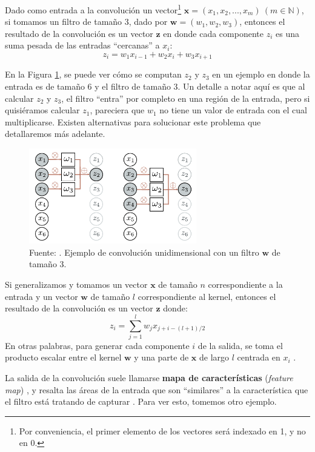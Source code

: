 \documentclass[../../main.tex]{subfiles}
\begin{document}
Dado como entrada a la convolución un vector\footnote{Por conveniencia, el primer elemento
de los vectores será indexado en 1, y no en 0.} \(\bm{x} = (x_1, x_2, ..., x_m)\ (m \in
\mathbb{N})\), si tomamos un filtro de tamaño 3, dado por \(\bm{w}=(w_1, w_2, w_3)\),
entonces el resultado de la convolución es un vector \(\bm{z}\) en donde cada componente
\(z_i\) es una suma pesada de las entradas ``cercanas'' a \(x_i\):
\[z_i = w_1 x_{i-1} + w_2 x_{i} + w_3 x_{i+1}\]


En la Figura \ref{fig:conv1d-example}, se puede ver cómo se computan \(z_2\) y \(z_3\) en
un ejemplo en donde la entrada es de tamaño 6 y el filtro de tamaño 3. Un detalle a notar
aquí es que al calcular \(z_2\) y \(z_3\), el filtro ``entra'' por completo en una región
de la entrada, pero si quisiéramos calcular \(z_1\), pareciera que \(w_1\) no tiene un
valor de entrada con el cual multiplicarse. Existen alternativas para solucionar este
problema que detallaremos más adelante.

\begin{figure}
    \centering
    \includegraphics[width=0.65\textwidth]{figs/conv1d-example1.png}
    \caption{Fuente: \cite{prince2024understanding}. Ejemplo de convolución unidimensional
    con un filtro \(\bm{w}\) de tamaño 3.}
    \label{fig:conv1d-example}
\end{figure}

Si generalizamos y tomamos un vector \(\bm{x}\) de tamaño \(n\) correspondiente
a la entrada y un vector \(\bm{w}\) de tamaño \(l\) correspondiente al kernel,
entonces el resultado de la convolución es un vector \(\bm{z}\) donde:
\begin{equation}
    z_i = \sum_{j=1}^l w_j x_{j+i-(l+1)/2}
    \label{eq:convolution}
\end{equation}
En otras palabras, para generar cada componente \(i\) de la salida, se toma el producto
escalar entre el kernel \(\bm{w}\) y una parte de \(\bm{x}\) de largo \(l\) centrada en
\(x_i\) \cite{ai-a-modern-approach}.

La salida de la convolución suele llamarse \textbf{mapa de características}
(\textit{feature map}) \cite{deep-learning}, y resalta las áreas de la entrada que son
``similares'' a la característica que el filtro está tratando de capturar
\cite{hands-on-ML-sklearn-tf}. Para ver esto, tomemos otro ejemplo.
\end{document}
